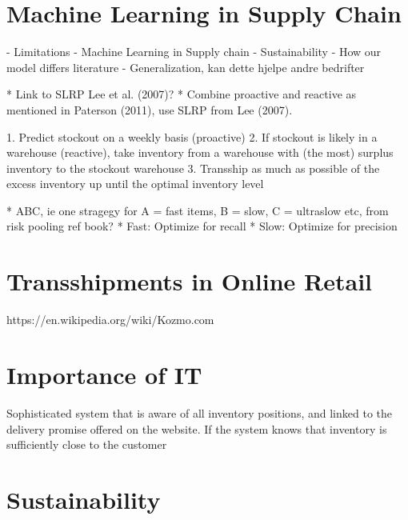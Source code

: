 \documentclass[../../main.tex]{subfiles}
\begin{document}

\section{Machine Learning in Supply Chain}


- Limitations
- Machine Learning in Supply chain
- Sustainability
- How our model differs literature
- Generalization, kan dette hjelpe andre bedrifter

* Link to SLRP Lee et al. (2007)?
  * Combine proactive and reactive as mentioned in Paterson (2011), use SLRP from Lee (2007).

1.	Predict stockout on a weekly basis (proactive)
2.	If stockout is likely in a warehouse (reactive), take inventory from a warehouse with (the most) surplus inventory to the stockout warehouse
3.	Transship as much as possible of the excess inventory up until the optimal inventory level

*	ABC, ie one stragegy for A = fast items, B = slow, C = ultraslow etc, from risk pooling ref book? 
  * Fast: Optimize for recall
  * Slow: Optimize for precision

\section{Transshipments in Online Retail}
https://en.wikipedia.org/wiki/Kozmo.com
\section{Importance of IT}
Sophisticated system that is aware of all inventory positions, and linked to the delivery promise offered on the website. If the system knows that inventory is sufficiently close to the customer
\section{Sustainability}

\end{document}
